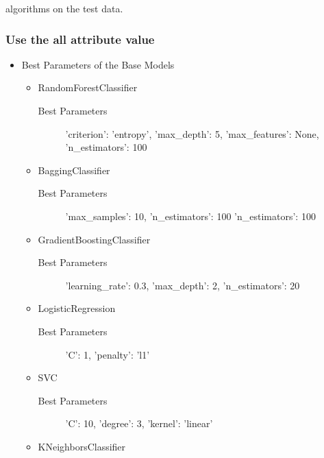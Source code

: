 algorithms on the test data. 

\subsubsection[Train_Data_1]{Use the all attribute value}

\begin{itemize}
	\item Best Parameters of the Base Models
	
	\begin{itemize}
		\item RandomForestClassifier
		
		\begin{description}
			\item[Best Parameters] 'criterion': 'entropy', 'max_depth': 5, 'max_features': None, 'n_estimators': 100
		\end{description}
		
		\item BaggingClassifier
		
		\begin{description}
			\item[Best Parameters] 'max_samples': 10, 'n_estimators': 100 'n_estimators': 100
		\end{description}
		
		\item GradientBoostingClassifier
		
		\begin{description}
			\item[Best Parameters] 'learning_rate': 0.3, 'max_depth': 2, 'n_estimators': 20
		\end{description}
		
		\item LogisticRegression
		
		\begin{description}
			\item[Best Parameters] 'C': 1, 'penalty': 'l1'
		\end{description}
		
		\item SVC
		
		\begin{description}
			\item[Best Parameters] 'C': 10, 'degree': 3, 'kernel': 'linear'
		\end{description}
		
		\item KNeighborsClassifier
		

\end{itemize}
\end{itemize}
